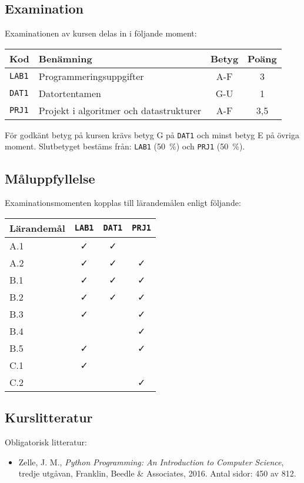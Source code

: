 \subsection*{Examination}

Examinationen av kursen delas in i följande moment:

\begin{longtable}[]{@{}llcc@{}}
\toprule
\textsf{Kod} & \textsf{Benämning} & \textsf{Betyg} & \textsf{Poäng}\tabularnewline
\midrule
\endhead
\texttt{LAB1} & Programmeringsuppgifter & A-F & 3\tabularnewline
\texttt{DAT1} & Datortentamen & G-U & 1\tabularnewline
\texttt{PRJ1} & Projekt i algoritmer och datastrukturer & A-F &
3,5\tabularnewline
\bottomrule
\end{longtable}

För godkänt betyg på kursen krävs betyg G på \texttt{DAT1} och minst betyg E på
övriga moment. Slutbetyget bestäms från: \texttt{LAB1} (50~\%) och \texttt{PRJ1} (50~\%).

\subsection*{Måluppfyllelse}

Examinationsmomenten kopplas till lärandemålen enligt följande:

\begin{longtable}[]{@{}lccc@{}}
\toprule
\textsf{Lärandemål} & \texttt{LAB1} & \texttt{DAT1} & \texttt{PRJ1}\tabularnewline
\midrule
\endhead
A.1 & \faCheck & \faCheck &\tabularnewline
A.2 & \faCheck & \faCheck & \faCheck\tabularnewline
B.1 & \faCheck & \faCheck & \faCheck\tabularnewline
B.2 & \faCheck & \faCheck & \faCheck\tabularnewline
B.3 & \faCheck & & \faCheck\tabularnewline
B.4 & & & \faCheck\tabularnewline
B.5 & \faCheck & & \faCheck\tabularnewline
C.1 & \faCheck & &\tabularnewline
C.2 & & & \faCheck\tabularnewline
\bottomrule
\end{longtable}

\subsection*{Kurslitteratur}

Obligatorisk litteratur:

\begin{itemize}
\tightlist
\item
  Zelle, J. M., \emph{Python Programming: An Introduction to Computer
  Science}, tredje utgåvan, Franklin, Beedle \& Associates, 2016. Antal
  sidor: 450 av 812.
\end{itemize}

